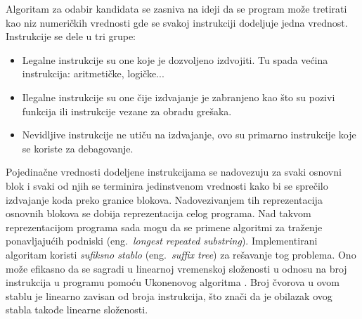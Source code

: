 \documentclass[12pt,oneside]{memoir}
\begin{document}
Algoritam za odabir kandidata se zasniva na ideji da se program može tretirati kao niz numeričkih vrednosti
gde se svakoj instrukciji dodeljuje jedna vrednost.
Instrukcije se dele u tri grupe:
\begin{itemize}
  \item Legalne instrukcije su one koje je dozvoljeno izdvojiti. Tu spada većina instrukcija: aritmetičke, logičke...
  \item Ilegalne instrukcije su one čije izdvajanje je zabranjeno kao što su pozivi funkcija ili instrukcije vezane za obradu grešaka.
  \item Nevidljive instrukcije ne utiču na izdvajanje, ovo su primarno instrukcije koje se koriste za debagovanje.
\end{itemize}
Pojedinačne vrednosti dodeljene instrukcijama se nadovezuju za svaki osnovni blok i svaki od njih se terminira jedinstvenom vrednosti kako bi se sprečilo izdvajanje koda preko granice blokova.
Nadovezivanjem tih reprezentacija osnovnih blokova se dobija reprezentacija celog programa.
Nad takvom reprezentacijom programa sada mogu da se primene algoritmi za traženje ponavljajućih podniski (eng.~{\em longest repeated substring}).
Implementirani algoritam koristi \emph{sufiksno stablo} (eng.~{\em suffix tree}) \cite{zivkovicalgoritmi} za rešavanje tog problema.
%
Ono može efikasno da se sagradi u linearnoj vremenskoj složenosti u odnosu na broj instrukcija u programu pomoću Ukonenovog algoritma \cite{ukkonen1993suffix}.
Broj čvorova u ovom stablu je linearno zavisan od broja instrukcija, što znači da je obilazak ovog stabla takođe linearne složenosti.
\end{document}
